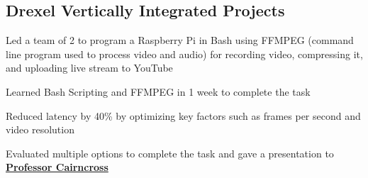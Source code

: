 \documentclass[]{deedy-resume-openfont}
\begin{document}
\begin{minipage}[t]{0.66\textwidth}
    \subsection{Drexel Vertically Integrated Projects}
    \vspace{\topsep} %
    \begin{tightemize}
        \item Led a team of 2 to program a Raspberry Pi in Bash using FFMPEG (command line program used to process video and audio) for recording video, compressing it, and uploading live stream to YouTube
        \item Learned Bash Scripting and FFMPEG in 1 week to complete the task
        \item Reduced latency by 40\% by optimizing key factors such as frames per second and video resolution
        \item Evaluated multiple options to complete the task and gave a presentation to \textbf{\href{https://drexel.edu/engineering/about/faculty-staff/C/cairncross-richard/}{Professor Cairncross}}
    \end{tightemize}
    \sectionsep



\end{minipage}
\end{document}

